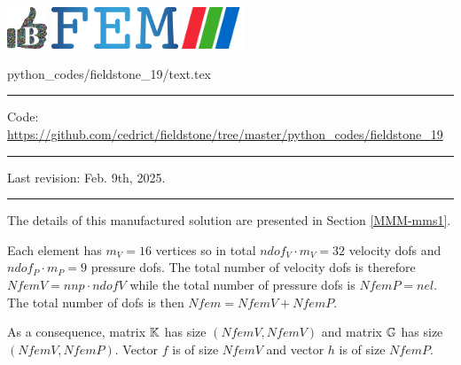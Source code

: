 \noindent
\includegraphics[height=1.25cm]{images/pictograms/benchmark}
\includegraphics[height=1.25cm]{images/pictograms/FEM}
\includegraphics[height=1.25cm]{images/pictograms/paraview}


\begin{flushright} {\tiny {\color{gray} python\_codes/fieldstone\_19/text.tex}} \end{flushright}

\par\noindent\rule{\textwidth}{0.4pt}

\begin{center}
\inpython
{\small Code: \url{https://github.com/cedrict/fieldstone/tree/master/python_codes/fieldstone_19}}
\end{center}

\par\noindent\rule{\textwidth}{0.4pt}

Last revision: Feb. 9th, 2025.

\par\noindent\rule{\textwidth}{0.4pt}


The details of this manufactured solution are presented in Section \ref{MMM-mms1}.

Each element has $m_V=16$ vertices so in total $ndof_V \cdot m_V=32$ 
velocity dofs and $ndof_P \cdot m_P=9$ pressure dofs. The total number of 
velocity dofs is therefore $NfemV=nnp \cdot ndofV$ while the total number of
pressure dofs is $NfemP=nel$. The total number of dofs is then $Nfem=NfemV+NfemP$.

As a consequence, matrix ${\mathbb{K}}$ has size $(NfemV,NfemV)$ and matrix ${\mathbb{G}}$ has size $(NfemV,NfemP)$.
Vector $f$ is of size $NfemV$ and vector $h$ is of size $NfemP$.  

